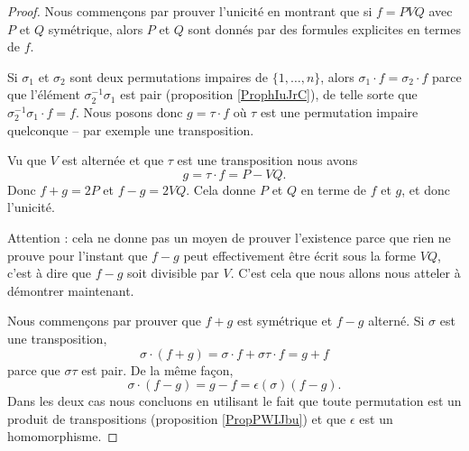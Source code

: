 \begin{proof}

    Nous commençons par prouver l'unicité en montrant que si \( f=PVQ\) avec \( P\) et \( Q\) symétrique, alors \( P\) et \( Q\) sont donnés par des formules explicites en termes de \( f\).


    Si \( \sigma_1\) et \( \sigma_2\) sont deux permutations impaires de \( \{ 1,\ldots, n \}\), alors \( \sigma_1\cdot f=\sigma_2\cdot f\) parce que l'élément \( \sigma_2^{-1}\sigma_1\) est pair (proposition \ref{ProphIuJrC}), de telle sorte que \( \sigma_2^{-1}\sigma_1\cdot f=f\). Nous posons donc \( g=\tau\cdot f\) où \( \tau\) est une permutation impaire quelconque -- par exemple une transposition.

    Vu que \( V\) est alternée et que \( \tau\) est une transposition nous avons
    \begin{equation}
        g=\tau\cdot f=P-VQ.
    \end{equation}
    Donc \( f+g=2P\) et \( f-g=2VQ\). Cela donne \( P\) et \( Q\) en terme de \( f\) et \( g\), et donc l'unicité.

    Attention : cela ne donne pas un moyen de prouver l'existence parce que rien ne prouve pour l'instant que \( f-g\) peut effectivement être écrit sous la forme \( VQ\), c'est à dire que \( f-g\) soit divisible par \( V\). C'est cela que nous allons nous atteler à démontrer maintenant.

    Nous commençons par prouver que \( f+g\) est symétrique et \( f-g\) alterné. Si \( \sigma\) est une transposition,
    \begin{equation}
        \sigma\cdot(f+g)=\sigma\cdot f+\sigma\tau\cdot f=g+f
    \end{equation}
    parce que \( \sigma\tau\) est pair. De la même façon,
    \begin{equation}
        \sigma\cdot(f-g)=g-f=\epsilon(\sigma)(f-g).
    \end{equation}
    Dans les deux cas nous concluons en utilisant le fait que toute permutation est un produit de transpositions (proposition \ref{PropPWIJbu}) et que \( \epsilon\) est un homomorphisme.


\end{proof}
